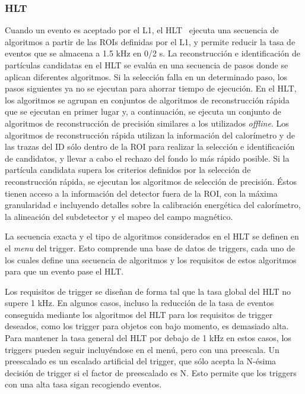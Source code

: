 \subsubsection{\acf{HLT}}


Cuando un evento es aceptado por el \ac{L1}, el \ac{HLT}~\cite{ATLAS-HLTTrigger} ejecuta una secuencia de algoritmos a partir de las \acp{ROI} definidas por el \ac{L1}, y permite reducir la tasa de eventos que se almacena a 1.5 kHz en 0/2 s.
La reconstrucción e identificación de partículas candidatas en el \ac{HLT} se evalúa en una secuencia de pasos donde se aplican diferentes algoritmos.
Si la selección falla en un determinado paso, los pasos siguientes ya no se ejecutan para ahorrar tiempo de ejecución.
En el \ac{HLT}, los algoritmos se agrupan en conjuntos de algoritmos de reconstrucción rápida que se ejecutan en primer lugar y, a continuación, se ejecuta un conjunto de algoritmos de reconstrucción de precisión similares a los utilizados \textit{offline}.
Los algoritmos de reconstrucción rápida utilizan la información del calorímetro y de las trazas del \ac{ID} sólo dentro de la \ac{ROI} para realizar la selección e identificación de candidatos, y llevar a cabo el rechazo del fondo lo más rápido posible.
Si la partícula candidata supera los criterios definidos por la selección de reconstrucción rápida, se ejecutan los algoritmos de selección de precisión. Éstos tienen acceso a la información del detector fuera de la \ac{ROI}, con la máxima granularidad e incluyendo detalles sobre la calibración energética del calorímetro, la alineación del subdetector y el mapeo del campo magnético.

La secuencia exacta y el tipo de algoritmos considerados en el \ac{HLT} se definen en el \textit{menu} del trigger. Esto comprende una base de datos de triggers, cada uno de los cuales define una secuencia de algoritmos y los requisitos de estos algoritmos para que un evento pase el \ac{HLT}.

Los requisitos de trigger se diseñan de forma tal que la tasa global del \ac{HLT} no supere 1 kHz. En algunos casos, incluso la reducción de la tasa de eventos conseguida mediante los algoritmos del \ac{HLT} para los requisitos de trigger deseados, como los trigger para objetos con bajo momento, es demasiado alta. Para mantener la tasa general del \ac{HLT} por debajo de 1 kHz en estos casos, los triggers pueden seguir incluyéndose en el menú, pero con una preescala. Un preescalado es un escalado artificial del trigger, que sólo acepta la N-\'esima decisión de trigger si el factor de preescalado es N. Esto permite que los triggers con una alta tasa sigan recogiendo eventos.

